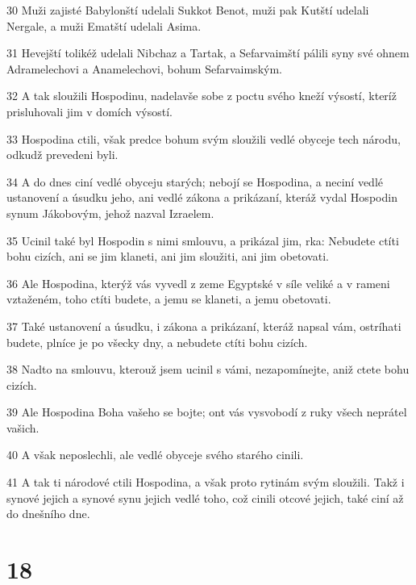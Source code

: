 \par 30 Muži zajisté Babylonští udelali Sukkot Benot, muži pak Kutští udelali Nergale, a muži Ematští udelali Asima.
\par 31 Hevejští tolikéž udelali Nibchaz a Tartak, a Sefarvaimští pálili syny své ohnem Adramelechovi a Anamelechovi, bohum Sefarvaimským.
\par 32 A tak sloužili Hospodinu, nadelavše sobe z poctu svého kneží výsostí, kteríž prisluhovali jim v domích výsostí.
\par 33 Hospodina ctili, však predce bohum svým sloužili vedlé obyceje tech národu, odkudž prevedeni byli.
\par 34 A do dnes ciní vedlé obyceju starých; nebojí se Hospodina, a neciní vedlé ustanovení a úsudku jeho, ani vedlé zákona a prikázaní, kteráž vydal Hospodin synum Jákobovým, jehož nazval Izraelem.
\par 35 Ucinil také byl Hospodin s nimi smlouvu, a prikázal jim, rka: Nebudete ctíti bohu cizích, ani se jim klaneti, ani jim sloužiti, ani jim obetovati.
\par 36 Ale Hospodina, kterýž vás vyvedl z zeme Egyptské v síle veliké a v rameni vztaženém, toho ctíti budete, a jemu se klaneti, a jemu obetovati.
\par 37 Také ustanovení a úsudku, i zákona a prikázaní, kteráž napsal vám, ostríhati budete, plníce je po všecky dny, a nebudete ctíti bohu cizích.
\par 38 Nadto na smlouvu, kterouž jsem ucinil s vámi, nezapomínejte, aniž ctete bohu cizích.
\par 39 Ale Hospodina Boha vašeho se bojte; ont vás vysvobodí z ruky všech neprátel vašich.
\par 40 A však neposlechli, ale vedlé obyceje svého starého cinili.
\par 41 A tak ti národové ctili Hospodina, a však proto rytinám svým sloužili. Takž i synové jejich a synové synu jejich vedlé toho, což cinili otcové jejich, také ciní až do dnešního dne.

\chapter{18}

